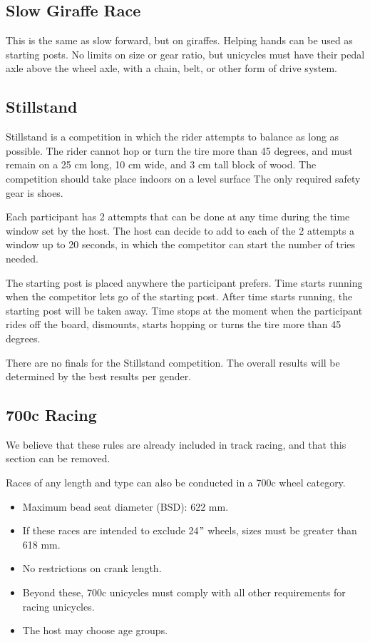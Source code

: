 \subsection{Slow Giraffe Race}

This is the same as slow forward, but on giraffes.
Helping hands can be used as starting posts.
No limits on size or gear ratio, but unicycles must have their pedal axle above the wheel axle, with a chain, belt, or other form of drive system.

\subsection{Stillstand}
Stillstand is a competition in which the rider attempts to balance as long as possible.
The rider cannot hop or turn the tire more than 45 degrees, and must remain on a 25 cm long, 10 cm wide, and 3 cm tall block of wood.
The competition should take place indoors on a level surface
The only required safety gear is shoes.

Each participant has 2 attempts that can be done at any time during the time window set by the host.
The host can decide to add to each of the 2 attempts a window up to 20 seconds, in which the competitor can start the number of tries needed.

The starting post is placed anywhere the participant prefers.
Time starts running when the competitor lets go of the starting post.
After time starts running, the starting post will be taken away.
Time stops at the moment when the participant rides off the board, dismounts, starts hopping or turns the tire more than 45 degrees.

There are no finals for the Stillstand competition.
The overall results will be determined by the best results per gender.

\subsection{700c Racing}

\begin{framed}
We believe that these rules are already included in track racing, and that this section can be removed.
\end{framed}


Races of any length and type can also be conducted in a 700c wheel category.
\begin{itemize}
\item Maximum bead seat diameter (BSD): 622 mm.
\item If these races are intended to exclude 24$"$ wheels, sizes must be greater than 618 mm.
\item No restrictions on crank length.
\item Beyond these, 700c unicycles must comply with all other requirements for racing unicycles.
\item The host may choose age groups.
\end{itemize}

